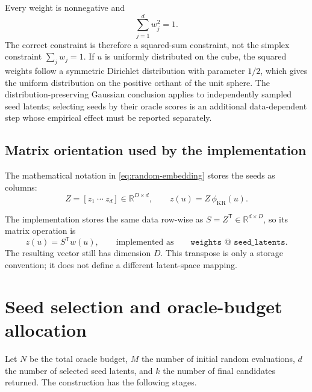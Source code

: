 \documentclass[11pt]{article}
\newcommand{\R}{\mathbb{R}}
\begin{document}
Every weight is nonnegative and
\begin{equation}
    \sum_{j=1}^{d}w_j^2=1.
    \label{eq:unit-weight-sum}
\end{equation}
The correct constraint is therefore a squared-sum constraint, not the simplex
constraint \(\sum_j w_j=1\).  If \(u\) is uniformly distributed on the cube,
the squared weights follow a symmetric Dirichlet distribution with parameter
\(1/2\), which gives the uniform distribution on the positive orthant of the
unit sphere.  The distribution-preserving Gaussian conclusion applies to
independently sampled seed latents; selecting seeds by their oracle scores is
an additional data-dependent step whose empirical effect must be reported
separately.

\subsection{Matrix orientation used by the implementation}
\label{sec:matrix-orientation}

The mathematical notation in \eqref{eq:random-embedding} stores the seeds as
columns:
\begin{equation}
    Z=[z_1\ \cdots\ z_d]\in\R^{D\times d},
    \qquad z(u)=Z\,\phi_{\mathrm{KR}}(u).
    \label{eq:column-seeds}
\end{equation}

The implementation stores the same data row-wise as
\(
S=Z^{\mathsf T}\in\R^{d\times D}
\), so its matrix operation is
\begin{equation}
    z(u)=S^{\mathsf T}w(u),
    \qquad\text{implemented as}\qquad
    \texttt{weights @ seed\_latents}.
    \label{eq:row-seed-implementation}
\end{equation}
The resulting vector still has dimension \(D\).  This transpose is only a
storage convention; it does not define a different latent-space mapping.

\section{Seed selection and oracle-budget allocation}
\label{sec:budget}

Let \(N\) be the total oracle budget, \(M\) the number of initial random
evaluations, \(d\) the number of selected seed latents, and \(k\) the number of
final candidates returned.  The construction has the following stages.
\end{document}
